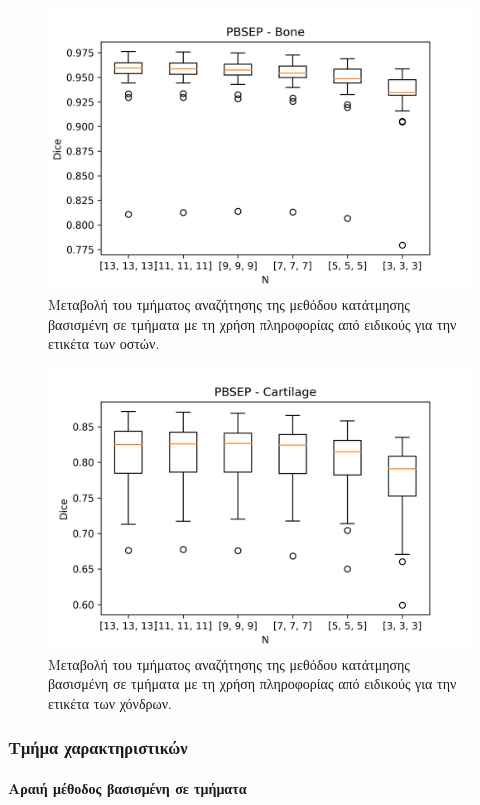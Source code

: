 \documentclass[a4paper,12pt]{article}
\newcommand{\paragraphLine}[1]{\paragraph{#1}\mbox{}}
\begin{document}
\begin{figure}[H]
    \centering
    \includegraphics[width=0.85\linewidth]{PBSEP_N_Bone_plot.png}
    \caption{Μεταβολή του τμήματος αναζήτησης της μεθόδου κατάτμησης βασισμένη
             σε τμήματα με τη χρήση πληροφορίας από ειδικούς για την ετικέτα των
             οστών.}
    \label{fig:PBSEP:N:2}
\end{figure}

\begin{figure}[H]
    \centering
    \includegraphics[width=0.85\linewidth]{PBSEP_N_Cartilage_plot.png}
    \caption{Μεταβολή του τμήματος αναζήτησης της μεθόδου κατάτμησης βασισμένη
             σε τμήματα με τη χρήση πληροφορίας από ειδικούς για την ετικέτα των
             χόνδρων.}
    \label{fig:PBSEP:N:3}
\end{figure}


\subsubsection{Τμήμα χαρακτηριστικών}

\paragraphLine{Αραιή μέθοδος βασισμένη σε τμήματα}
\end{document}
